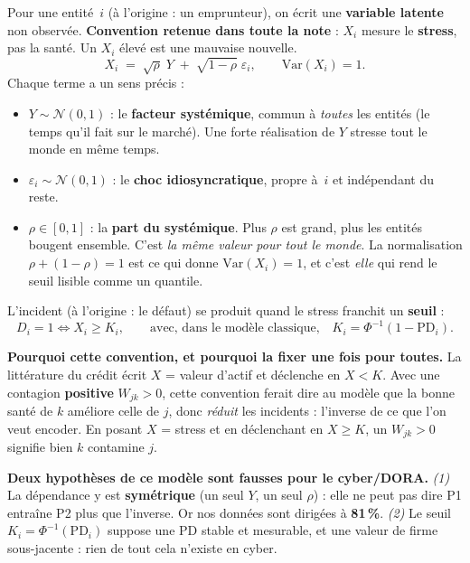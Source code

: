 \documentclass[11pt,a4paper]{article}
\newcommand{\Y}{Y}
\newcommand{\eps}{\varepsilon}
\begin{document}
Pour une entité~$i$ (à l'origine : un emprunteur), on écrit une \textbf{variable latente}
non observée. \textbf{Convention retenue dans toute la note} : $X_i$ mesure le
\textbf{stress}, pas la santé. Un $X_i$ élevé est une mauvaise nouvelle.
\begin{equation}
X_i \;=\; \sqrt{\rho}\;\Y \;+\; \sqrt{1-\rho}\;\eps_i , \qquad \mathrm{Var}(X_i)=1 .
\end{equation}
Chaque terme a un sens précis :
\begin{itemize}[leftmargin=1.4em,itemsep=1pt]
\item $\Y \sim \mathcal N(0,1)$ : le \textbf{facteur systémique}, commun à \emph{toutes}
  les entités (le \og{}temps qu'il fait\fg{} sur le marché). Une forte réalisation de
  $\Y$ stresse tout le monde en même temps.
\item $\eps_i \sim \mathcal N(0,1)$ : le \textbf{choc idiosyncratique}, propre à~$i$ et
  indépendant du reste.
\item $\rho \in [0,1]$ : la \textbf{part du systémique}. Plus $\rho$ est grand, plus les
  entités bougent ensemble. C'est \emph{la même valeur pour tout le monde}. La
  normalisation $\rho + (1-\rho) = 1$ est ce qui donne $\mathrm{Var}(X_i)=1$, et c'est
  \emph{elle} qui rend le seuil lisible comme un quantile.
\end{itemize}
L'incident (à l'origine : le défaut) se produit quand le stress franchit un \textbf{seuil} :
\begin{equation}
D_i = 1 \iff X_i \ge K_i, \qquad\text{avec, dans le modèle classique,}\quad
K_i = \Phi^{-1}(1-\mathrm{PD}_i).
\end{equation}

\begin{cle}
\textbf{Pourquoi cette convention, et pourquoi la fixer une fois pour toutes.} La
littérature du crédit écrit $X$ = valeur d'actif et déclenche en $X < K$. Avec une
contagion \textbf{positive} $W_{jk} > 0$, cette convention ferait dire au modèle que
\og{}la bonne santé de $k$ améliore celle de $j$\fg{}, donc \emph{réduit} les incidents :
l'inverse de ce que l'on veut encoder. En posant $X$ = stress et en déclenchant
en $X \ge K$, un $W_{jk} > 0$ signifie bien \og{}$k$ contamine $j$\fg{}.
\end{cle}

\begin{attention}
\textbf{Deux hypothèses de ce modèle sont fausses pour le cyber/DORA.}
\emph{(1)} La dépendance y est \textbf{symétrique} (un seul $\Y$, un seul $\rho$) : elle ne
peut pas dire \og{}P1 entraîne P2 plus que l'inverse\fg{}. Or nos données sont dirigées à
\textbf{81\,\%}. \emph{(2)} Le seuil $K_i=\Phi^{-1}(\mathrm{PD}_i)$ suppose une PD stable et
mesurable, et une \og{}valeur de firme\fg{} sous-jacente : rien de tout cela n'existe en cyber.
\end{attention}
\end{document}
